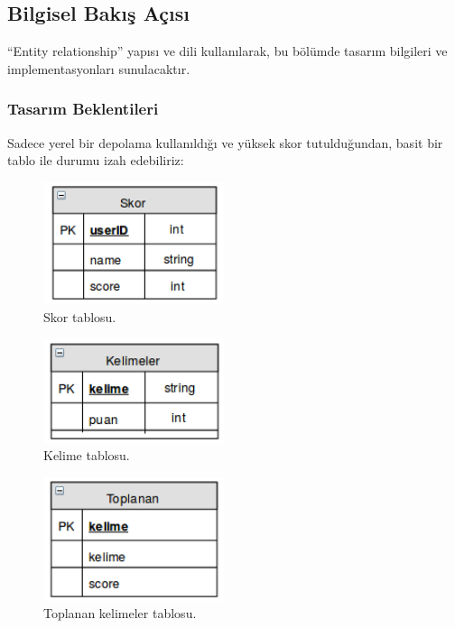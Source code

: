 \documentclass[12pt,a4paper]{article}
\begin{document}
   \subsection{Bilgisel Bakış Açısı}
   “Entity relationship” yapısı ve dili kullanılarak, bu bölümde tasarım bilgileri ve implementasyonları sunulacaktır.

   \subsubsection{Tasarım Beklentileri}
   Sadece yerel bir depolama kullanıldığı ve yüksek skor tutulduğundan, basit bir tablo ile durumu izah edebiliriz:

   \begin{figure}
      \begin{center}
            \includegraphics[width=200px]{img/img4.png}
            \caption{Skor tablosu.}
            \label{fig:dort}
      \end{center}
   \end{figure}

   \begin{figure}
      \begin{center}
            \includegraphics[width=200px]{img/img5.png}
            \caption{Kelime tablosu.}
            \label{fig:bes}
      \end{center}
   \end{figure}

   \begin{figure}
      \begin{center}
            \includegraphics[width=200px]{img/img6.png}
            \caption{Toplanan kelimeler tablosu.}
            \label{fig:alti}
      \end{center}
   \end{figure}
\end{document}
